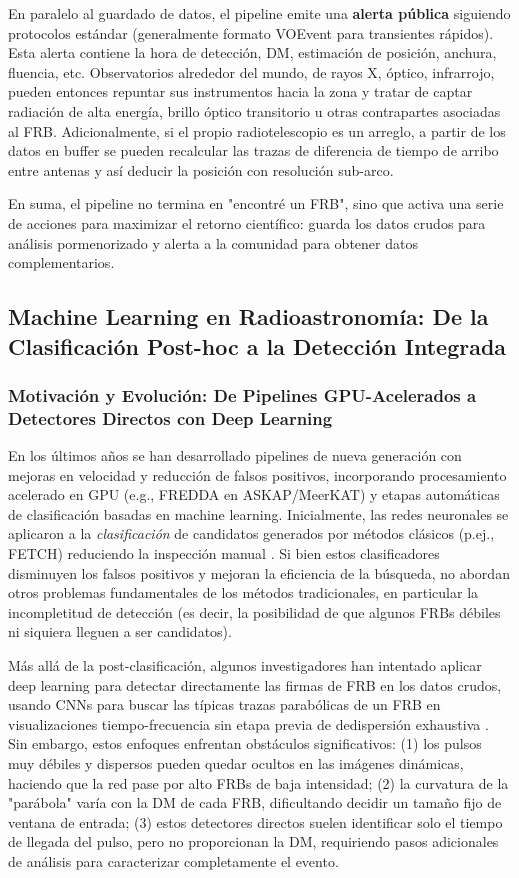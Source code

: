 En paralelo al guardado de datos, el pipeline emite una \textbf{alerta pública} siguiendo protocolos estándar (generalmente formato VOEvent para transientes rápidos). Esta alerta contiene la hora de detección, DM, estimación de posición, anchura, fluencia, etc. Observatorios alrededor del mundo, de rayos X, óptico, infrarrojo, pueden entonces repuntar sus instrumentos hacia la zona y tratar de captar radiación de alta energía, brillo óptico transitorio u otras contrapartes asociadas al FRB. Adicionalmente, si el propio radiotelescopio es un arreglo, a partir de los datos en buffer se pueden recalcular las trazas de diferencia de tiempo de arribo entre antenas y así deducir la posición con resolución sub-arco.

En suma, el pipeline no termina en "encontré un FRB", sino que activa una serie de acciones para maximizar el retorno científico: guarda los datos crudos para análisis pormenorizado y alerta a la comunidad para obtener datos complementarios.


\subsection{Machine Learning en Radioastronomía: De la Clasificación Post-hoc a la Detección Integrada}

\subsubsection{Motivación y Evolución: De Pipelines GPU-Acelerados a Detectores Directos con Deep Learning}

En los últimos años se han desarrollado pipelines de nueva generación con mejoras en velocidad y reducción de falsos positivos, incorporando procesamiento acelerado en GPU (e.g., FREDDA en ASKAP/MeerKAT) y etapas automáticas de clasificación basadas en machine learning. Inicialmente, las redes neuronales se aplicaron a la \textit{clasificación} de candidatos generados por métodos clásicos (p.ej., FETCH) reduciendo la inspección manual \citep{Agarwal_2020,Petroff_2022}. Si bien estos clasificadores disminuyen los falsos positivos y mejoran la eficiencia de la búsqueda, no abordan otros problemas fundamentales de los métodos tradicionales, en particular la incompletitud de detección (es decir, la posibilidad de que algunos FRBs débiles ni siquiera lleguen a ser candidatos).

Más allá de la post-clasificación, algunos investigadores han intentado aplicar deep learning para detectar directamente las firmas de FRB en los datos crudos, usando CNNs para buscar las típicas trazas parabólicas de un FRB en visualizaciones tiempo-frecuencia sin etapa previa de dedispersión exhaustiva \citep{Zhang_2020}. Sin embargo, estos enfoques enfrentan obstáculos significativos: (1) los pulsos muy débiles y dispersos pueden quedar ocultos en las imágenes dinámicas, haciendo que la red pase por alto FRBs de baja intensidad; (2) la curvatura de la "parábola" varía con la DM de cada FRB, dificultando decidir un tamaño fijo de ventana de entrada; (3) estos detectores directos suelen identificar solo el tiempo de llegada del pulso, pero no proporcionan la DM, requiriendo pasos adicionales de análisis para caracterizar completamente el evento.

